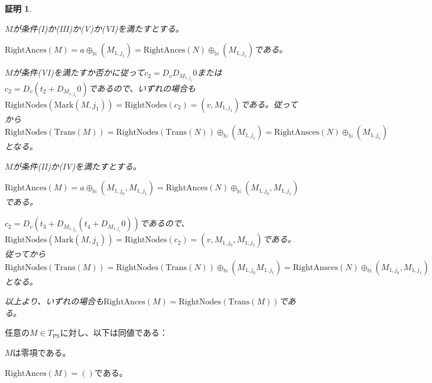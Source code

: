 \documentclass[dvipdfmx,uplatex]{jsarticle}
\theoremstyle{customnonumberbreakfortheorem}
\theoremstyle{customnonumberbreakforproof}
\newtheorem{hideableproof}{証明}
\begin{document}
\begin{hideableproof}
\begin{indented}
\begin{indented}
\begin{indented}
				\item \(M\)が条件(I)か(III)か(V)か(VI)を満たすとする。
				\begin{indented}
					\item \(\textrm{RightAnces}(M) = a \oplus_{\mathbb{N}} (M_{1,j_1}) = \textrm{RightAnces}(N) \oplus_{\mathbb{N}} (M_{1,j_1})\)である。
					\item \(M\)が条件(VI)を満たすか否かに従って\(c_2 = D_v D_{M_{1,j_1}} 0 \)または\(c_2 = D_v(t_2 + D_{M_{1,j_1}} 0)\)であるので、いずれの場合も\(\textrm{RightNodes}(\textrm{Mark}(M,j_1)) = \textrm{RightNodes}(c_2) = (v,M_{1,j_1})\)である。従ってから\(\textrm{RightNodes}(\textrm{Trans}(M)) = \textrm{RightNodes}(\textrm{Trans}(N)) \oplus_{\mathbb{N}} (M_{1,j_1}) = \textrm{RightAnsces}(N) \oplus_{\mathbb{N}} (M_{1,j_1})\)となる。
				\end{indented}
				\item \(M\)が条件(II)か(IV)を満たすとする。
				\begin{indented}
					\item \(\textrm{RightAnces}(M) = a \oplus_{\mathbb{N}} (M_{1,j_0},M_{1,j_1}) = \textrm{RightAnces}(N) \oplus_{\mathbb{N}} (M_{1,j_0},M_{1,j_1})\)である。
					\item \(c_2 = D_v(t_3 + D_{M_{1,j_0}}(t_4 + D_{M_{1,j_1}} 0))\)であるので、\(\textrm{RightNodes}(\textrm{Mark}(M,j_1)) = \textrm{RightNodes}(c_2) = (v,M_{1,j_0},M_{1,j_1})\)である。従ってから\(\textrm{RightNodes}(\textrm{Trans}(M)) = \textrm{RightNodes}(\textrm{Trans}(N)) \oplus_{\mathbb{N}} (M_{1,j_0}M_{1,j_1}) = \textrm{RightAnsces}(N) \oplus_{\mathbb{N}} (M_{1,j_0},M_{1,j_1})\)となる。
				\end{indented}
				\item 以上より、いずれの場合も\(\textrm{RightAnces}(M) = \textrm{RightNodes}(\textrm{Trans}(M))\)である。
			\end{indented}
		\end{indented}
	\end{indented}
\end{hideableproof}

\begin{corollary}\label{非零項のRightAncesが非空であること}
	任意の\(M \in T_{\textrm{PS}}\)に対し、以下は同値である：
	\begin{penumerate}
		\item \(M\)は零項である。
		\item \(\textrm{RightAnces}(M) = ()\)である。
	\end{penumerate}
\end{corollary}
\end{document}
